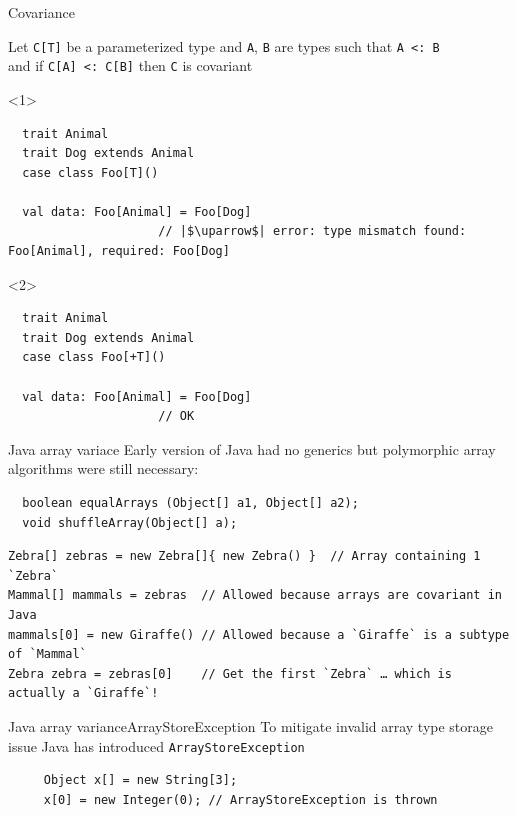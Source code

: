 \documentclass[aspectratio=169]{beamer}
\begin{document}
\begin{frame}[fragile]{Covariance}
  \begin{block}{}
  Let \texttt{C[T]} be a parameterized type and \texttt{A}, \texttt{B} are types such that \texttt{A <:
  B} \\
  and if \texttt{C[A] <: C[B]} then \texttt{C} is \alert{covariant} 
  \end{block}
  \vspace{1em}
\begin{onlyenv}<1>
    \begin{verbatim}
  trait Animal
  trait Dog extends Animal
  case class Foo[T]()
  
  val data: Foo[Animal] = Foo[Dog]
                     // |$\uparrow$| error: type mismatch found: Foo[Animal], required: Foo[Dog]
  \end{verbatim}
\end{onlyenv}
\begin{onlyenv}<2>
    \begin{verbatim}
  trait Animal
  trait Dog extends Animal
  case class Foo[+T]()
  
  val data: Foo[Animal] = Foo[Dog] 
                     // OK
  \end{verbatim}
\end{onlyenv}
\end{frame}

\begin{frame}[fragile]{Java array variace}
  Early version of Java had no generics but polymorphic array algorithms were still necessary:
  \vspace{1em}
  \begin{verbatim}
  boolean equalArrays (Object[] a1, Object[] a2);
  void shuffleArray(Object[] a);
  \end{verbatim}
  \vspace{1em}
  \pause
  \begin{verbatim}
Zebra[] zebras = new Zebra[]{ new Zebra() }  // Array containing 1 `Zebra`
Mammal[] mammals = zebras  // Allowed because arrays are covariant in Java
mammals[0] = new Giraffe() // Allowed because a `Giraffe` is a subtype of `Mammal`
Zebra zebra = zebras[0]    // Get the first `Zebra` … which is actually a `Giraffe`!
  \end{verbatim}
\end{frame}

\begin{frame}[fragile]{Java array variance}{ArrayStoreException}
  To mitigate invalid array type storage issue Java has introduced
  \texttt{ArrayStoreException} \cite{arstex}
  \vspace{3em}
  \begin{verbatim}
     Object x[] = new String[3];
     x[0] = new Integer(0); // ArrayStoreException is thrown
  \end{verbatim}
\end{frame}
\end{document}
